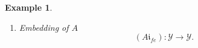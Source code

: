 \documentclass[aps,preprint]{revtex4}%
\newtheorem{example}[theorem]{Example}
\begin{document}
\begin{example}
\begin{enumerate}
\begin{enumerate}
\begin{gather}
=\left(
\begin{array}
[c]{cc}%
\mathcal{R}_{e}\left(  A\right)  _{11} & \mathcal{R}_{e}\left(  A\right)
_{12}\\
\mathcal{R}_{e}\left(  A\right)  _{21} & \mathcal{R}_{e}\left(  A\right)
_{22}\\
0 & 0
\end{array}
\right)  ,
\end{gather}
i.e.%
\begin{equation}
\mathcal{R}_{fe}\left(  A\right)  =\mathcal{M}_{fe}\left(  A\right)  =\left(
\begin{array}
[c]{cc}%
\mathcal{R}_{fe}\left(  A\right)  _{11} & \mathcal{R}_{fe}\left(  A\right)
_{12}\\
\mathcal{R}_{fe}\left(  A\right)  _{21} & \mathcal{R}_{fe}\left(  A\right)
_{22}\\
\mathcal{R}_{fe}\left(  A\right)  _{31} & \mathcal{R}_{fe}\left(  A\right)
_{32}%
\end{array}
\right)  .
\end{equation}


\item Embedding of $A\ $%
\begin{equation}
\left(  A\mathfrak{i}_{fe}\right)  :\mathcal{Y\rightarrow Y}.
\end{equation}



\end{enumerate}
\end{enumerate}
\end{example}
\end{document}
